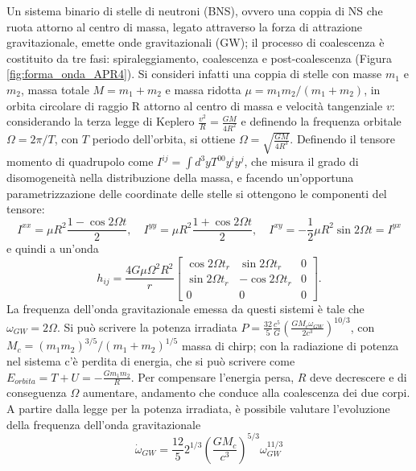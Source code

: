Un sistema binario di stelle di neutroni (BNS), ovvero una coppia di NS che ruota attorno al centro di massa, legato attraverso la forza di attrazione gravitazionale, emette onde gravitazionali (GW); il processo di coalescenza è costituito da tre fasi: spiraleggiamento, coalescenza e post-coalescenza (Figura \ref{fig:forma_onda_APR4}). Si consideri infatti una coppia di stelle con masse $m_1$ e $m_2$, massa totale $M = m_1 + m_2$ e massa ridotta $\mu = m_1m_2/(m_1+m_2)$, in orbita circolare di raggio R attorno al centro di massa e velocità tangenziale $v$: considerando la terza legge di Keplero $\frac{v^2}{R} = \frac{GM}{4R^2}$ e definendo la frequenza orbitale $\Omega=2\pi/T$, con $T$ periodo dell'orbita, si ottiene	$\Omega=\sqrt{\frac{GM}{4R^3}}$.  Definendo il tensore momento di quadrupolo come $I^{ij} = \int d^3yT^{00}y^iy^j$, che misura il grado di disomogeneità nella distribuzione della massa, e facendo un'opportuna parametrizzazione delle coordinate delle stelle si ottengono le componenti del tensore:
\begin{equation}
	I^{xx} = \mu R^2\frac{1-\cos{2\Omega t}}{2}, \quad I^{yy} = \mu R^2\frac{1+\cos{2\Omega t}}{2}, \quad I^{xy}  = -\frac{1}{2}\mu R^2\sin{2\Omega t}= I^{yx}
	\label{eqn:quadrupole_moment}
\end{equation}
e quindi a un'onda
\begin{equation}
	h_{ij} = \frac{4G\mu\Omega^2R^2}{r}
	\begin{bmatrix}
	\cos{2\Omega t_r}	&\sin{2\Omega t_r}	&0\\
	\sin{2\Omega t_r}	&-\cos{2\Omega t_r}	&0\\
	0					&0					&0
	\end{bmatrix}.
	\label{eqn:wave_form}
\end{equation}
La frequenza dell'onda gravitazionale emessa da questi sistemi è tale che $\omega_{GW} = 2\Omega$.
Si può scrivere la potenza irradiata $P=\frac{32}{5}\frac{c^5}{G}\left(\frac{GM_c\omega_{GW}}{2c^3}\right)^{10/3}$, con $M_c=\left(m_1m_2\right)^{3/5}/\left(m_1+m_2\right)^{1/5}$ massa di chirp; con la radiazione di potenza nel sistema c'è perdita di energia, che si può scrivere come $E_{orbita} = T + U = -\frac{Gm_1m_2}{R}$. Per compensare l'energia persa, $R$ deve decrescere e di conseguenza $\Omega$ aumentare, andamento che conduce alla coalescenza dei due corpi.
A partire dalla legge per la potenza irradiata, è possibile valutare l'evoluzione della frequenza dell'onda gravitazionale 
\begin{equation}
	\dot{\omega}_{GW} = \frac{12}{5}2^{1/3}\left(\frac{GM_c}{c^3}\right)^{5/3}\omega_{GW}^{11/3}
	\label{eqn:gw_frequency_law}
\end{equation} 
